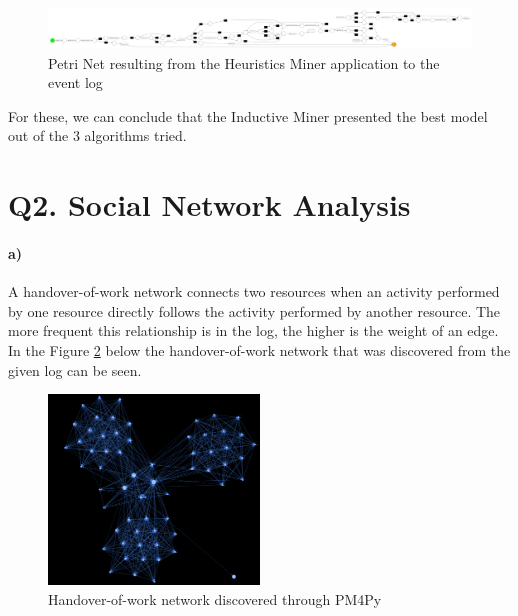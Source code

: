 \documentclass[12pt]{report}
\begin{document}
\begin{figure}[h]
    \centering
    \includegraphics[width=\textwidth]{figures/q1_f_heuristics_miner.pdf}
    \caption{Petri Net resulting from the Heuristics Miner application to the event log}
    \label{fig:figures-q1_f_heuristics_miner-pdf}
\end{figure}

For these, we can conclude that the Inductive Miner presented the best model out of the 3 algorithms tried.

\section{Q2. Social Network Analysis}
\paragraph{a)} 

A handover-of-work network connects two resources when an activity performed by one resource directly follows the activity performed by another resource. The more frequent this relationship is in the log, the higher is the weight of an edge. In the Figure \ref{fig:figures-q2_handover-png} below the handover-of-work network that was discovered from the given log can be seen.

\begin{figure}[h]
    \centering
    \includegraphics[width=0.5\textwidth]{figures/q2_handover.png}
    \caption{Handover-of-work network discovered through PM4Py}
    \label{fig:figures-q2_handover-png}
\end{figure}
\end{document}
